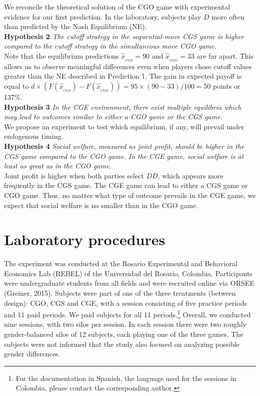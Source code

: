 \documentclass[12pt, letterpaper]{article}
\theoremstyle{plain}
\begin{document}
We reconcile the theoretical solution of the CGO game with experimental evidence for our first prediction. In the laboratory, subjects play $D$ more often than predicted by the Nash Equilibrium (NE). \\

\noindent \textbf{Hypothesis 2}
\textit{The cutoff strategy in the sequential-move CGS game is higher compared to the cutoff strategy in the simultaneous move CGO game.}\\

Note that the equilibrium predictions $\hat{x}_{_{CGS}}=90$ and $\hat{x}_{_{CGO}}=33$ are far apart. This allows us to observe meaningful differences even when players chose cutoff values greater than the NE described in Prediction 1. The gain in expected payoff is equal to $d\times \left( F(\hat{x}_{_{CGS}})-F(\hat{x}_{_{CGO}}) \right)=95\times( 90-33)/100=50$ points or 137\%. \\

\noindent \textbf{Hypothesis 3} \textit{In the CGE environment, there exist multiple equilibria which may lead to outcomes similar to either a CGO game or the CGS game.}\\

We propose an experiment to test which equilibrium, if any, will prevail under endogenous timing. \\

\noindent \textbf{Hypothesis 4} \textit{Social welfare, measured as joint profit, should be higher in the CGS game compared to the CGO game. In the CGE game, social welfare is at least as great as in the CGO game}.\\

Joint profit is higher when both parties select $DD$, which appears more frequently in the CGS game. The CGE game can lead to either a CGS game or CGO game. Thus, no matter what type of outcome prevails in the CGE game, we expect that social welfare is no smaller than in the CGO game.\\

\section{Laboratory procedures}
\label{sec:game}

The experiment was conducted at the Rosario Experimental and Behavioral Economics Lab (REBEL) of the Universidad del Rosario, Colombia. Participants were undergraduate students from all fields and were recruited online via ORSEE (Greiner, 2015). Subjects were part of one of the three treatments (between design): CGO, CGS and CGE,  with a session consisting of five practice periods and 11 paid periods. We paid subjects for all 11 periods.\footnote{For the documentation in Spanish, the language used for the sessions in Colombia, please contact the corresponding author.} Overall, we conducted nine sessions, with two silos per session. In each session there were two roughly gender-balanced silos of 12 subjects, each playing one of the three games. The subjects were not informed that the study also focused on analyzing possible gender differences.
\end{document}
